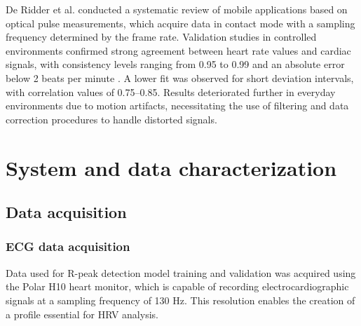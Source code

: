 \documentclass[journal]{IEEEtran}
\begin{document}
\newpage
De Ridder et al. \cite{19} conducted a systematic review of mobile applications based on optical pulse measurements, which acquire data in contact mode with a sampling frequency determined by the frame rate. Validation studies in controlled environments confirmed strong agreement between heart rate values and cardiac signals, with consistency levels ranging from 0.95 to 0.99 and an absolute error below 2 beats per minute \cite{20}. A lower fit was observed for short deviation intervals, with correlation values of 0.75–0.85. Results deteriorated further in everyday environments due to motion artifacts, necessitating the use of filtering and data correction procedures to handle distorted signals.


\section{System and data characterization}
\subsection{Data acquisition}
\subsubsection{ECG data acquisition}
Data used for R-peak detection model training and validation was acquired using the Polar H10 heart monitor, which is capable of recording electrocardiographic signals at a sampling frequency of 130 Hz. This resolution enables the creation of a profile essential for HRV analysis.
\end{document}
